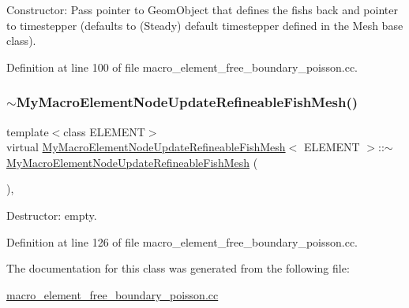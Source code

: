 Constructor\+: Pass pointer to Geom\+Object that defines the fish\textquotesingle{}s back and pointer to timestepper (defaults to (Steady) default timestepper defined in the Mesh base class). 



Definition at line 100 of file macro\+\_\+element\+\_\+free\+\_\+boundary\+\_\+poisson.\+cc.

\mbox{\label{classMyMacroElementNodeUpdateRefineableFishMesh_af125f6a37aedce2fa19309d2908c1b3c}} 
\subsubsection{\texorpdfstring{$\sim$\+My\+Macro\+Element\+Node\+Update\+Refineable\+Fish\+Mesh()}{~MyMacroElementNodeUpdateRefineableFishMesh()}}
{\footnotesize\ttfamily template$<$class E\+L\+E\+M\+E\+NT$>$ \\
virtual \hyperlink{classMyMacroElementNodeUpdateRefineableFishMesh}{My\+Macro\+Element\+Node\+Update\+Refineable\+Fish\+Mesh}$<$ E\+L\+E\+M\+E\+NT $>$\+::$\sim$\hyperlink{classMyMacroElementNodeUpdateRefineableFishMesh}{My\+Macro\+Element\+Node\+Update\+Refineable\+Fish\+Mesh} (\begin{DoxyParamCaption}{ }\end{DoxyParamCaption})\hspace{0.3cm}{\ttfamily [inline]}, {\ttfamily [virtual]}}



Destructor\+: empty. 



Definition at line 126 of file macro\+\_\+element\+\_\+free\+\_\+boundary\+\_\+poisson.\+cc.



The documentation for this class was generated from the following file\+:\begin{DoxyCompactItemize}
\item 
\hyperlink{macro__element__free__boundary__poisson_8cc}{macro\+\_\+element\+\_\+free\+\_\+boundary\+\_\+poisson.\+cc}\end{DoxyCompactItemize}
